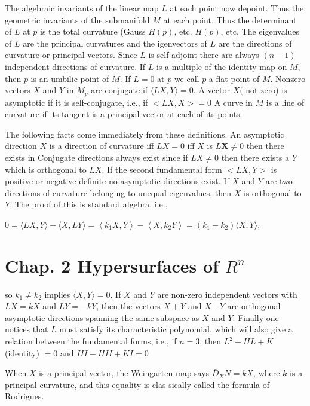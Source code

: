 \documentclass[10pt]{article}
\begin{document}
The algebraic invariants of the linear map $L$ at each point now depoint. Thus the geometric invariants of the submanifold $M$ at each point. Thus the determinant of $L$ at $p$ is the total curvature (Gauss $H(p)$, etc. $H(p)$, etc. The eigenvalues of $L$ are the principal curvatures and the igenvectors of $L$ are the directions of curvature or principal vectors. Since $L$ is self-adjoint there are always $(n-1)$ independent directions of curvature. If $L$ is a multiple of the identity map on $M$, then $p$ is an umbilic point of $M$. If $L=0$ at $p$ we call $p$ a flat point of $M$. Nonzero vectors $X$ and $Y$ in $M_{p}$ are conjugate if $\langle L X, Y\rangle=0$. A vector $X($ not zero) is asymptotic if it is self-conjugate, i.e., if $<L X, X>=0$ A curve in $M$ is a line of curvature if its tangent is a principal vector at each of its points.

The following facts come immediately from these definitions. An asymptotic direction $X$ is a direction of curvature iff $L X=0$ iff $X$ is $L \boldsymbol{X} \neq 0$ then there exists in Conjugate directions always exist since if $L X \neq 0$ then there exists a $Y$ which is orthogonal to $L X$. If the second fundamental form $<L X, Y>$ is positive or negative definite no asymptotic directions exist. If $X$ and $Y$ are two directions of curvature belonging to unequal eigenvalues, then $X$ is orthogonal to $Y$. The proof of this is standard algebra, i.e.,

$0=\langle L X, Y\rangle-\langle X, L Y\rangle=\left\langle k_{1} X, Y\right\rangle-\left\langle X, k_{2} Y\right\rangle=\left(k_{1}-k_{2}\right)\langle X, Y\rangle$,

\section{Chap. 2 Hypersurfaces of $R^{n}$}
so $k_{1} \neq k_{2}$ implies $\langle X, Y\rangle=0$. If $X$ and $Y$ are non-zero independent vectors with $L X=k X$ and $L Y=-k Y$, then the vectors $X+Y$ and $X$ - $Y$ are orthogonal asymptotic directions spanning the same subspace as $X$ and $Y$. Finally one notices that $L$ must satisfy its characteristic polynomial, which will also give a relation between the fundamental forms, i.e., if $n=3$, then $L^{2}-H L+K$ (identity) $=0$ and $I I I-H I I+K I=0$

When $X$ is a principal vector, the Weingarten map says $\bar{D}_{X} N=k X$, where $k$ is a principal curvature, and this equality is clas sically called the formula of Rodrigues.
\end{document}
